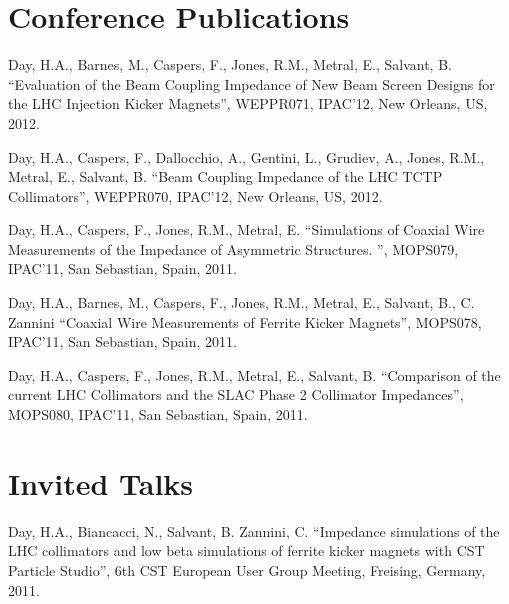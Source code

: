 \documentclass[margin,line]{resume}
\begin{document}
\begin{resume}
\vspace{-2mm}


    \section{\mysidestyle Conference Publications}

    
	Day, H.A., Barnes, M., Caspers, F., Jones, R.M., Metral, E., Salvant, B.
    ``Evaluation of the Beam Coupling Impedance of New Beam Screen Designs for the LHC Injection Kicker Magnets'',
    WEPPR071, IPAC'12, New Orleans, US, 2012.

\vspace{-2mm}

	Day, H.A., Caspers, F., Dallocchio, A., Gentini, L., Grudiev, A., Jones, R.M., Metral, E., Salvant, B.
    ``Beam Coupling Impedance of the LHC TCTP Collimators'',
    WEPPR070, IPAC'12, New Orleans, US, 2012.

\vspace{-2mm}

	Day, H.A., Caspers, F., Jones, R.M., Metral, E.
    ``Simulations of Coaxial Wire Measurements of the Impedance of Asymmetric Structures. '',
    MOPS079, IPAC'11, San Sebastian, Spain, 2011.

\vspace{-2mm}

	Day, H.A., Barnes, M., Caspers, F., Jones, R.M., Metral, E., Salvant, B., C. Zannini
    ``Coaxial Wire Measurements of Ferrite Kicker Magnets'',
    MOPS078, IPAC'11, San Sebastian, Spain, 2011.

\vspace{-2mm}

	Day, H.A., Caspers, F., Jones, R.M., Metral, E., Salvant, B.
    ``Comparison of the current LHC Collimators and the SLAC Phase 2 Collimator Impedances'',
    MOPS080, IPAC'11, San Sebastian, Spain, 2011.

    \section{\mysidestyle Invited Talks}

	Day, H.A., Biancacci, N., Salvant, B. Zannini, C.
    ``Impedance simulations of the LHC collimators and low beta simulations of ferrite kicker magnets with CST Particle Studio'',
    6th CST European User Group Meeting, Freising, Germany, 2011.



\end{resume}
\end{document}
